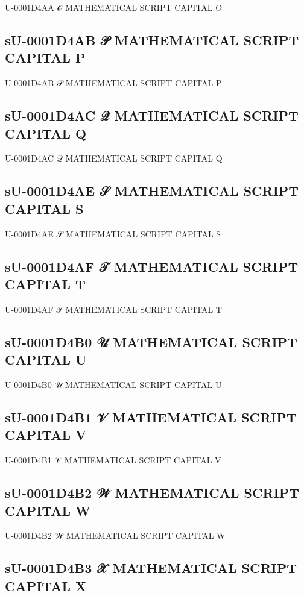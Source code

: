 U-0001D4AA 𝒪 MATHEMATICAL SCRIPT CAPITAL O

\subsection{sU-0001D4AB 𝒫 MATHEMATICAL SCRIPT CAPITAL P}

U-0001D4AB 𝒫 MATHEMATICAL SCRIPT CAPITAL P

\subsection{sU-0001D4AC 𝒬 MATHEMATICAL SCRIPT CAPITAL Q}

U-0001D4AC 𝒬 MATHEMATICAL SCRIPT CAPITAL Q

\subsection{sU-0001D4AE 𝒮 MATHEMATICAL SCRIPT CAPITAL S}

U-0001D4AE 𝒮 MATHEMATICAL SCRIPT CAPITAL S

\subsection{sU-0001D4AF 𝒯 MATHEMATICAL SCRIPT CAPITAL T}

U-0001D4AF 𝒯 MATHEMATICAL SCRIPT CAPITAL T

\subsection{sU-0001D4B0 𝒰 MATHEMATICAL SCRIPT CAPITAL U}

U-0001D4B0 𝒰 MATHEMATICAL SCRIPT CAPITAL U

\subsection{sU-0001D4B1 𝒱 MATHEMATICAL SCRIPT CAPITAL V}

U-0001D4B1 𝒱 MATHEMATICAL SCRIPT CAPITAL V

\subsection{sU-0001D4B2 𝒲 MATHEMATICAL SCRIPT CAPITAL W}

U-0001D4B2 𝒲 MATHEMATICAL SCRIPT CAPITAL W

\subsection{sU-0001D4B3 𝒳 MATHEMATICAL SCRIPT CAPITAL X}

